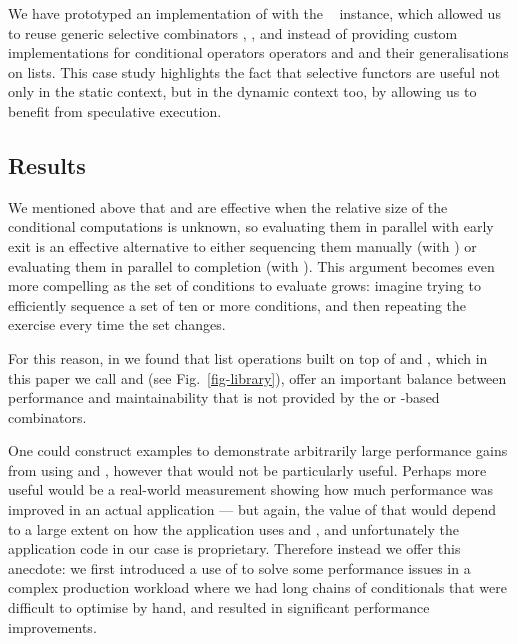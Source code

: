 We have prototyped an implementation of \Haxl with the ~
instance, which allowed us to reuse generic selective combinators
\hs{<||>}, \hs{<&&>},  and  instead of providing custom
implementations for conditional operators operators  and  and
their generalisations on lists. This case study highlights the fact that
selective functors are useful not only in the static context, but in the dynamic
context too, by allowing us to benefit from speculative execution.

\subsection{Results}

We mentioned above that  and  are effective when the
relative size of the conditional computations is unknown, so
evaluating them in parallel with early exit is an effective
alternative to either sequencing them manually (with ) or
evaluating them in parallel to completion (with
). This argument becomes even more compelling as the
set of conditions to evaluate grows: imagine trying to efficiently
sequence a set of ten or more conditions, and then repeating the
exercise every time the set changes.

For this reason, in \Haxl we found that list operations built on top
of  and , which in this paper we call  and
 (see Fig.~\ref{fig-library}), offer an important balance
between performance and maintainability that is not provided by the
 or -based combinators.

One could construct examples to demonstrate arbitrarily large
performance gains from using  and , however that
would not be particularly useful. Perhaps more useful would be a
real-world measurement showing how much performance was improved in an
actual application --- but again, the value of that would depend to a
large extent on how the application uses  and , and
unfortunately the application code in our case is
proprietary. Therefore instead we offer this anecdote: we first
introduced a use of  to solve some performance issues in a
complex production workload where we had long chains of conditionals
that were difficult to optimise by hand, and  resulted in
significant performance improvements.
